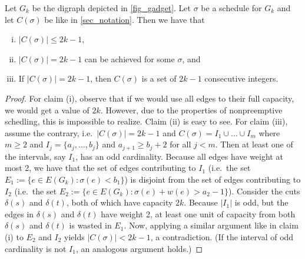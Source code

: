 \documentclass[runningheads]{llncs}
\numberwithin{equation}{section}
\newcommand{\set}[1]{\{ #1 \}}
\newcommand{\fromto}[2]{\set{#1, \ldots, #2}}
\begin{document}
\begin{lemma}
\label{lemma_gadget}
Let $G_k$ be the digraph depicted in \cref{fig_gadget}. Let $\sigma$ be a schedule for $G_k$ and let $C(\sigma)$ be like in \cref{sec_notation}. Then we have that \begin{enumerate}[(i)]
\item $|C(\sigma)| \leq 2k -1$,
\item $|C(\sigma)| = 2k -1$ can be achieved for some $\sigma$, and
\item If $|C(\sigma)| = 2k -1$, then $C(\sigma)$ is a set of $2k-1$ consecutive integers.
\label{lemma_gadget_case_3}
\end{enumerate}
\end{lemma}
\begin{proof}
For claim (i), observe that if we would use all edges to their full capacity, we would get a value of $2k$. However, due to the properties of nonpreemptive schedling, this is impossible to realize. Claim (ii) is easy to see. For claim (iii), assume the contrary, i.e.\ $|C(\sigma)| = 2k -1$ and $C(\sigma) = I_1 \cup \dots \cup I_m$ where $m \geq 2$ and $I_j = \fromto{a_j}{b_j}$ and $a_{j+1} \geq b_j + 2$ for all $j < m$. Then at least one of the intervals, say $I_1$, has an odd cardinality. Because  all edges have weight at most 2, we have that the set of edges contributing to $I_1$ (i.e.\ the set $E_1 := \set{e \in E(G_k) : \sigma(e) < b_1}$) is disjoint from the set of edges contributing to $I_2$ (i.e.\ the set $E_2 := \set{e \in E(G_k) : \sigma(e) + w(e) > a_2 - 1}$). Consider the cuts $\delta(s)$ and $\delta(t)$, both of which have capacity $2k$. Because $|I_1|$ is odd, but the edges in $\delta(s)$ and $\delta(t)$ have weight 2, at least one unit of capacity from both $\delta(s)$ and $\delta(t)$ is wasted in $E_1$. Now, applying a similar argument like in claim (i) to $E_2$ and $I_2$ yields $|C(\sigma)| < 2k - 1$, a contradiction. (If the interval of odd cardinality is not $I_1$, an analogous argument holds.)
\end{proof}
\end{document}
